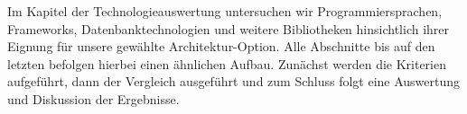  \label{chap:Technologieauswertung}
Im Kapitel der Technologieauswertung untersuchen wir Programmiersprachen, Frameworks, Datenbanktechnologien und weitere Bibliotheken hinsichtlich ihrer Eignung für unsere gewählte Architektur-Option. Alle Abschnitte bis auf den letzten befolgen hierbei einen ähnlichen Aufbau. Zunächst werden die Kriterien aufgeführt, dann der Vergleich ausgeführt und zum Schluss folgt eine Auswertung und Diskussion der Ergebnisse.


\newpage


\newpage


\newpage


